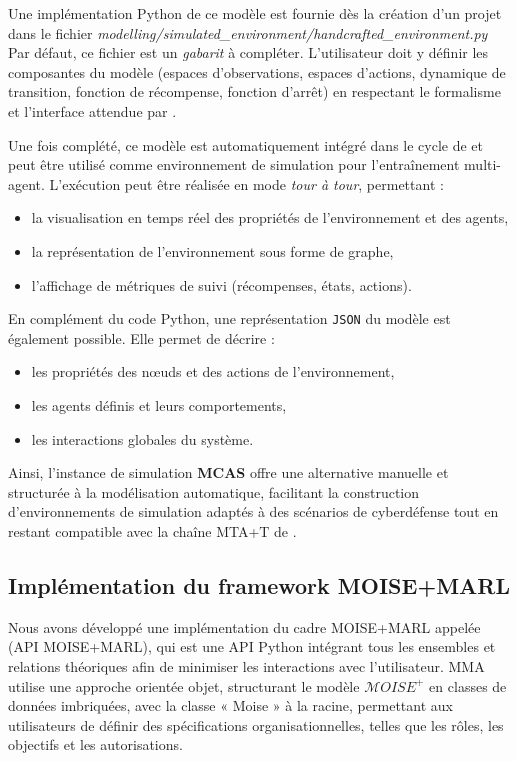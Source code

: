 Une implémentation Python de ce modèle est fournie dès la création d’un projet dans le fichier
\textit{modelling/simulated\_environment/handcrafted\_environment.py}
Par défaut, ce fichier est un \textit{gabarit} à compléter. L’utilisateur doit y définir les composantes du modèle (espaces d’observations, espaces d’actions, dynamique de transition, fonction de récompense, fonction d’arrêt) en respectant le formalisme  et l’interface attendue par .


Une fois complété, ce modèle est automatiquement intégré dans le cycle de  et peut être utilisé comme environnement de simulation pour l’entraînement multi-agent. L’exécution peut être réalisée en mode \textit{tour à tour}, permettant :
\begin{itemize}
  \item la visualisation en temps réel des propriétés de l’environnement et des agents,
  \item la représentation de l’environnement sous forme de graphe,
  \item l’affichage de métriques de suivi (récompenses, états, actions).
\end{itemize}
En complément du code Python, une représentation \texttt{JSON} du modèle est également possible. Elle permet de décrire :
\begin{itemize}
  \item les propriétés des nœuds et des actions de l’environnement,
  \item les agents définis et leurs comportements,
  \item les interactions globales du système.
\end{itemize}

\medskip
Ainsi, l'instance de simulation \textbf{MCAS} offre une alternative manuelle et structurée à la modélisation automatique, facilitant la construction d’environnements de simulation adaptés à des scénarios de cyberdéfense tout en restant compatible avec la chaîne MTA+T de .

\subsection{Implémentation du framework MOISE+MARL}

Nous avons développé une implémentation du cadre MOISE+MARL appelée ~\hyperref[fn:github]{\footnotemark[2]} (API MOISE+MARL), qui est une API Python intégrant tous les ensembles et relations théoriques afin de minimiser les interactions avec l'utilisateur. MMA utilise une approche orientée objet, structurant le modèle $\mathcal{M}OISE^+$ en classes de données imbriquées, avec la classe « Moise » à la racine, permettant aux utilisateurs de définir des spécifications organisationnelles, telles que les rôles, les objectifs et les autorisations.


